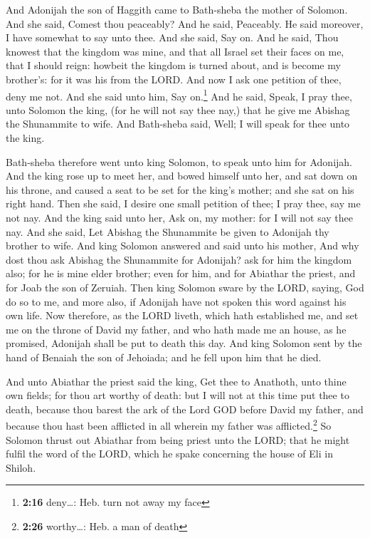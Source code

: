  And Adonijah the son of Haggith came to Bath-sheba the
mother of Solomon. And she said, Comest thou peaceably? And he said,
Peaceably.  He said moreover, I have somewhat to say unto
thee. And she said, Say on.  And he said, Thou knowest
that the kingdom was mine, and that all Israel set their faces on me,
that I should reign: howbeit the kingdom is turned about, and is become
my brother's: for it was his from the LORD.  And now I
ask one petition of thee, deny me not. And she said unto him, Say
on.\footnote{\textbf{2:16} deny\ldots: Heb. turn not away my face}
 And he said, Speak, I pray thee, unto Solomon the king,
(for he will not say thee nay,) that he give me Abishag the Shunammite
to wife.  And Bath-sheba said, Well; I will speak for
thee unto the king.

 Bath-sheba therefore went unto king Solomon, to speak
unto him for Adonijah. And the king rose up to meet her, and bowed
himself unto her, and sat down on his throne, and caused a seat to be
set for the king's mother; and she sat on his right hand.
 Then she said, I desire one small petition of thee; I
pray thee, say me not nay. And the king said unto her, Ask on, my
mother: for I will not say thee nay.  And she said, Let
Abishag the Shunammite be given to Adonijah thy brother to wife.
 And king Solomon answered and said unto his mother, And
why dost thou ask Abishag the Shunammite for Adonijah? ask for him the
kingdom also; for he is mine elder brother; even for him, and for
Abiathar the priest, and for Joab the son of Zeruiah. 
Then king Solomon sware by the LORD, saying, God do so to me, and more
also, if Adonijah have not spoken this word against his own life.
 Now therefore, as the LORD liveth, which hath
established me, and set me on the throne of David my father, and who
hath made me an house, as he promised, Adonijah shall be put to death
this day.  And king Solomon sent by the hand of Benaiah
the son of Jehoiada; and he fell upon him that he died.

 And unto Abiathar the priest said the king, Get thee to
Anathoth, unto thine own fields; for thou art worthy of death: but I
will not at this time put thee to death, because thou barest the ark of
the Lord GOD before David my father, and because thou hast been
afflicted in all wherein my father was afflicted.\footnote{\textbf{2:26}
  worthy\ldots: Heb. a man of death}  So Solomon thrust
out Abiathar from being priest unto the LORD; that he might fulfil the
word of the LORD, which he spake concerning the house of Eli in Shiloh.

